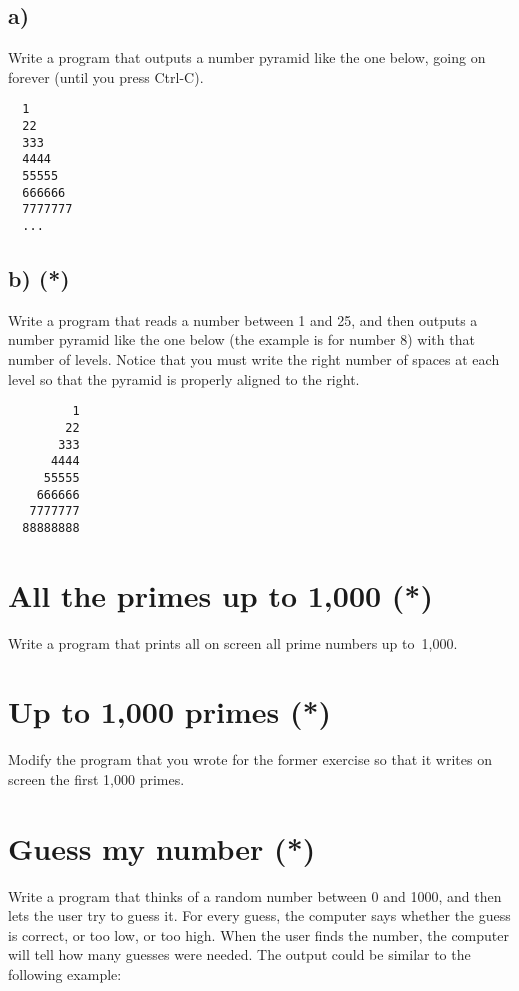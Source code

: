 \documentclass{article}
\begin{document}
\subsection*{a)}
\label{sec:number-pyramidsa}

Write a program that outputs a number pyramid like the one below,
going on forever (until you press Ctrl-C). 

\begin{verbatim}
  1
  22
  333
  4444
  55555
  666666
  7777777
  ...
\end{verbatim}

\subsection*{b) (*)}
\label{sec:number-pyramidsb}

Write a program that reads a number between 1 and 25, and then outputs
a number pyramid like the one below (the example is for number 8) with
that number of levels. Notice that you must write the right number of
spaces at each level so that the pyramid is properly aligned to the
right. 

\begin{verbatim}
         1
        22
       333
      4444
     55555
    666666
   7777777
  88888888
\end{verbatim}

\section{All the primes up to 1,000 (*)}
\label{sec:all-primes-up}

Write a program that prints all on screen all prime numbers up
to~1,000. 

\section{Up to 1,000 primes (*)}
\label{sec:all-primes-uprr}

Modify the program that you wrote for the former exercise so that it
writes on screen the first 1,000 primes. 

\section{Guess my number (*)}
\label{sec:guess-my-number}

Write a program that thinks of a random number between 0 and 1000, and
then lets the user try to guess it. For every guess, the computer says
whether the guess is correct, or too low, or too high. When the user
finds the number, the computer will tell how many guesses were
needed. The output could be similar to the following example: 
\end{document}
